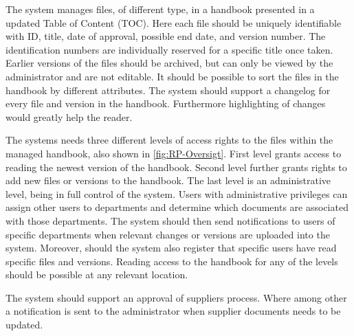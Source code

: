 The system manages files, of different type, in a handbook presented in a updated Table of Content (TOC).
Here each file should be uniquely identifiable with ID, title, date of approval, possible end date, and version number.
The identification numbers are individually reserved for a specific title once taken.
Earlier versions of the files should be archived, but can only be viewed by the administrator and are not editable.
It should be possible to sort the files in the handbook by different attributes.
The system should support a changelog for every file and version in the handbook.
Furthermore highlighting of changes would greatly help the reader.

The systems needs three different levels of access rights to the files within the managed handbook, also shown in \cref{fig:RP-Oversigt}.
First level grants access to reading the newest version of the handbook.
Second level further grants rights to add new files or versions to the handbook.
The last level is an administrative level, being in full control of the system.
Users with administrative privileges can assign other users to departments and determine which documents are associated with those departments.
The system should then send notifications to users of specific departments when relevant changes or versions are uploaded into the system.
Moreover, should the system also register that specific users have read specific files and versions.
Reading access to the handbook for any of the levels should be possible at any relevant location.

The system should support an approval of suppliers process.
Where among other a notification is sent to the administrator when supplier documents needs to be updated.

